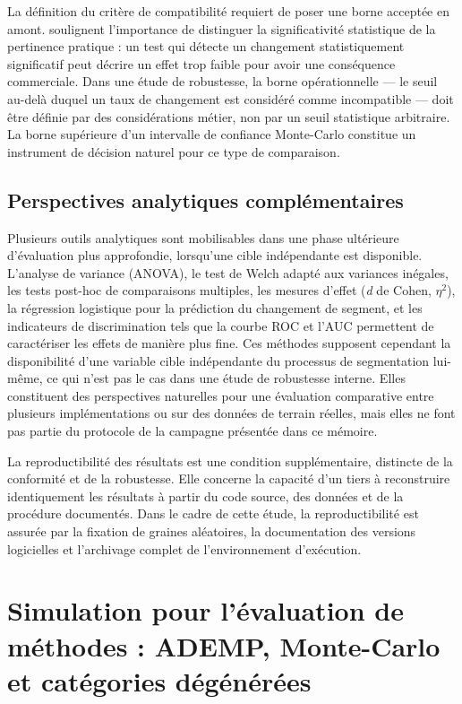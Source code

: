 La définition du critère de compatibilité requiert de poser une borne acceptée en amont.
\citet{Lakens2013} soulignent l'importance de distinguer la significativité statistique de
la pertinence pratique : un test qui détecte un changement statistiquement significatif peut
décrire un effet trop faible pour avoir une conséquence commerciale. Dans une étude de
robustesse, la borne opérationnelle — le seuil au-delà duquel un taux de changement est
considéré comme incompatible — doit être définie par des considérations métier, non par un
seuil statistique arbitraire. La borne supérieure d'un intervalle de confiance Monte-Carlo
constitue un instrument de décision naturel pour ce type de comparaison.

\subsection{Perspectives analytiques complémentaires}
\label{subsec:revue-perspectives}

Plusieurs outils analytiques sont mobilisables dans une phase ultérieure d'évaluation plus
approfondie, lorsqu'une cible indépendante est disponible. L'analyse de variance (ANOVA),
le test de Welch adapté aux variances inégales, les tests post-hoc de comparaisons multiples,
les mesures d'effet (\emph{d} de Cohen, $\eta^2$), la régression logistique pour la
prédiction du changement de segment, et les indicateurs de discrimination tels que la courbe
ROC et l'AUC permettent de caractériser les effets de manière plus fine. Ces méthodes
supposent cependant la disponibilité d'une variable cible indépendante du processus de
segmentation lui-même, ce qui n'est pas le cas dans une étude de robustesse interne.
Elles constituent des perspectives naturelles pour une évaluation comparative entre plusieurs
implémentations ou sur des données de terrain réelles, mais elles ne font pas partie du
protocole de la campagne présentée dans ce mémoire.

La reproductibilité des résultats est une condition supplémentaire, distincte de la
conformité et de la robustesse. Elle concerne la capacité d'un tiers à reconstruire
identiquement les résultats à partir du code source, des données et de la procédure
documentés. Dans le cadre de cette étude, la reproductibilité est assurée par la fixation
de graines aléatoires, la documentation des versions logicielles et l'archivage complet de
l'environnement d'exécution.

\section{Simulation pour l'évaluation de méthodes : ADEMP, Monte-Carlo et catégories dégénérées}
\label{sec:revue-simulation}

